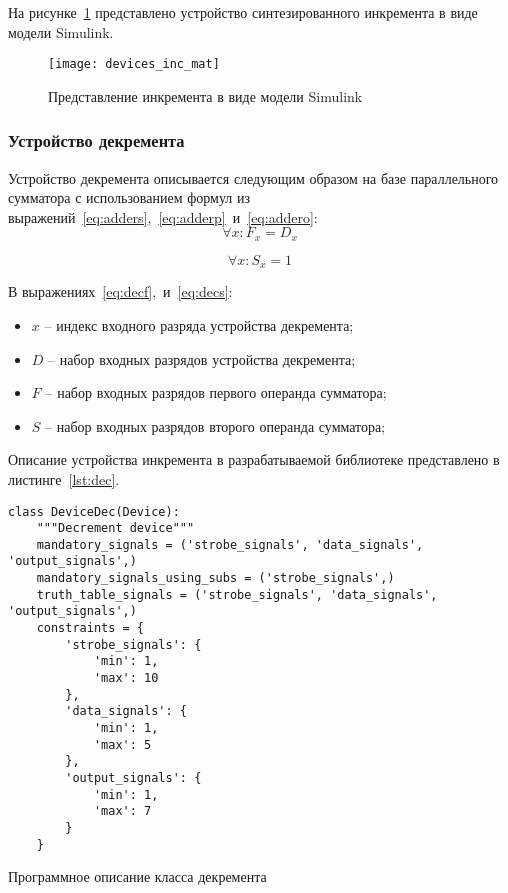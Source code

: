 \documentclass[document.tex]{subfiles}
\begin{document}
\clearpage

На рисунке~\ref{fig:deviceincmat} представлено устройство
синтезированного инкремента в виде модели Simulink.

\begin{figure}[here]
\texttt{[image: devices\_inc\_mat]}
\caption{Представление инкремента в виде модели Simulink}
\label{fig:deviceincmat}
\end{figure}

\clearpage
\subsubsection{Устройство декремента}

Устройство декремента описывается следующим образом на базе параллельного
сумматора с использованием формул из
выражений~\ref{eq:adders},~\ref{eq:adderp}~и~\ref{eq:addero}:
\begin{equation}
\label{eq:decf}
\forall x: F_x = D_x 
\end{equation}

\begin{equation}
\label{eq:decs}
\forall x: S_x = 1
\end{equation}

В выражениях~\ref{eq:decf},~и~\ref{eq:decs}:
\begin{itemize}[noitemsep]
  \item $x$ -- индекс входного разряда устройства декремента;
  \item $D$ -- набор входных разрядов устройства декремента;
  \item $F$ -- набор входных разрядов первого операнда сумматора;
  \item $S$ -- набор входных разрядов второго операнда сумматора;
\end{itemize}

\clearpage

Описание устройства инкремента в разрабатываемой библиотеке представлено в
листинге~\ref{lst:dec}.

\begin{listing}[ht]
\begin{verbatim}
class DeviceDec(Device):
    """Decrement device"""
    mandatory_signals = ('strobe_signals', 'data_signals', 'output_signals',)
    mandatory_signals_using_subs = ('strobe_signals',)
    truth_table_signals = ('strobe_signals', 'data_signals', 'output_signals',)
    constraints = {
        'strobe_signals': {
            'min': 1,
            'max': 10
        },
        'data_signals': {
            'min': 1,
            'max': 5
        },
        'output_signals': {
            'min': 1,
            'max': 7
        }
    }
\end{verbatim}
\caption{Программное описание класса декремента}
\label{lst:dec}
\end{listing}
\end{document}

